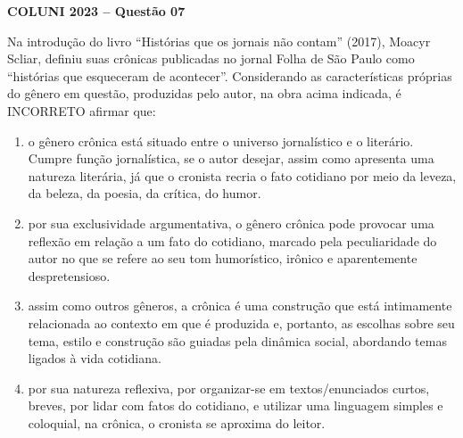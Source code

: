 \textbf{COLUNI 2023 -- Questão 07}\par\medskip Na introdução do livro “Histórias que os jornais não contam” (2017), Moacyr Scliar, definiu suas crônicas publicadas no jornal Folha de São Paulo como “histórias que esqueceram de acontecer”. Considerando as características próprias do gênero em questão, produzidas pelo autor, na obra acima indicada, é INCORRETO afirmar que:\begin{enumerate}
\item o gênero crônica está situado entre o universo jornalístico e o literário. Cumpre função jornalística, se o
      autor desejar, assim como apresenta uma natureza literária, já que o cronista recria o fato cotidiano por
      meio da leveza, da beleza, da poesia, da crítica, do humor.
\item por sua exclusividade argumentativa, o gênero crônica pode provocar uma reflexão em relação a um fato
      do cotidiano, marcado pela peculiaridade do autor no que se refere ao seu tom humorístico, irônico e
      aparentemente despretensioso.
\item assim como outros gêneros, a crônica é uma construção que está intimamente relacionada ao contexto
      em que é produzida e, portanto, as escolhas sobre seu tema, estilo e construção são guiadas pela
      dinâmica social, abordando temas ligados à vida cotidiana.
\item por sua natureza reflexiva, por organizar-se em textos/enunciados curtos, breves, por lidar com fatos do
      cotidiano, e utilizar uma linguagem simples e coloquial, na crônica, o cronista se aproxima do leitor.\end{enumerate}
